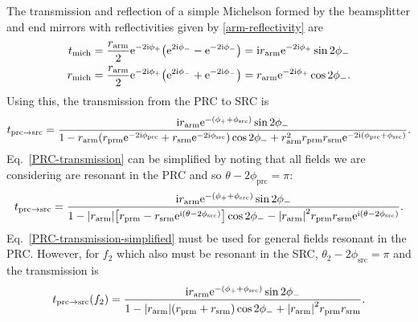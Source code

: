 \documentclass[12pt]{article}
\newcommand{\mr}[1]{\mathrm{#1}}
\newcommand{\e}{\mr{e}}
\renewcommand{\i}{\mr{i}}
\newcommand{\abs}[1]{\left|#1\right|}
\let\originalleft\left
\let\originalright\right
\renewcommand{\left}{\mathopen{}\mathclose\bgroup\originalleft}
\renewcommand{\right}{\aftergroup\egroup\originalright}
\begin{document}
The transmission and reflection of a simple Michelson formed by the beamsplitter and end mirrors with reflectivities given by \eqref{arm-reflectivity} are
\begin{align}
t_\mr{mich} &= \frac{r_\mr{arm}}{2} \e^{-2\i\phi_+}\left( \e^{2\i\phi_-} - \e^{-2\i\phi_-}\right)
= \i r_\mr{arm} \e^{-2\i\phi_+} \sin 2\phi_- \\
r_\mr{mich} &= \frac{r_\mr{arm}}{2} \e^{-2\i\phi_+}\left( \e^{2\i\phi_-} + \e^{-2\i\phi_-}\right)
= r_\mr{arm} \e^{-2\i\phi_+} \cos 2\phi_-.
\end{align}
Using this, the transmission from the PRC to SRC is
\begin{equation}
t_{\mr{prc}\to\mr{src}} = \frac{\i r_\mr{arm} \e^{-(\phi_+ + \phi_\mr{src})} \sin 2\phi_-}
{1 - r_\mr{arm} \left( r_\mr{prm} \e^{-2\i\phi_\mr{prc}} + r_\mr{srm} \e^{-2\i\phi_\mr{src}} \right) \cos 2\phi_-
+ r_\mr{arm}^2 r_\mr{prm} r_\mr{srm} \e^{-2\i (\phi_\mr{prc} + \phi_\mr{src})}}.
\label{PRC-transmission}
\end{equation}
Eq.~\eqref{PRC-transmission} can be simplified by noting that all fields we are considering are resonant in the PRC and so $\theta - 2\phi_\mr{prc} = \pi$:
\begin{equation}
t_{\mr{prc}\to\mr{src}} = \frac{\i r_\mr{arm} \e^{-(\phi_+ + \phi_\mr{src})} \sin 2\phi_-}
{1 - \abs{r_\mr{arm}} \left[ r_\mr{prm} - r_\mr{srm} \e^{\i(\theta -2\phi_\mr{src})} \right] \cos 2\phi_-
-  \abs{r_\mr{arm}}^2 r_\mr{prm} r_\mr{srm} \e^{\i(\theta - 2\phi_\mr{src})}}.
\label{PRC-transmission-simplified}
\end{equation}
Eq.~\eqref{PRC-transmission-simplified} must be used for general fields resonant in the PRC. However, for $f_2$ which also must be resonant in the SRC, $\theta_2 - 2\phi_\mr{src} = \pi$ and the transmission is
\begin{equation}
t_{\mr{prc}\to\mr{src}}(f_2) = \frac{\i r_\mr{arm} \e^{-(\phi_+ + \phi_\mr{src})} \sin 2\phi_-}
{1 - \abs{r_\mr{arm}} \left( r_\mr{prm} + r_\mr{srm} \right) \cos 2\phi_-
+  \abs{r_\mr{arm}}^2 r_\mr{prm} r_\mr{srm}}.
\label{PRC-transmission-f2}
\end{equation}
\end{document}
